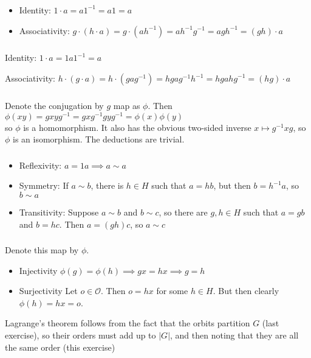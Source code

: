 \documentclass{article}
\newcommand{\inv}[1]{ {#1}^{-1} }
\newcommand{\sheaf}{ \mathcal{O} }
\begin{document}
\subsubsection{}\label{ex7p15}
\begin{itemize}
\item Identity: $1\cdot a = a\inv{1} = a1 = a$
\item Associativity: $g\cdot(h\cdot a) = g\cdot(a\inv{h})=a\inv{h}\inv{g} = a\inv{gh} = (gh)\cdot a$
\end{itemize}
\subsubsection{}\label{ex7p16}
\item Identity: $1\cdot a = 1a\inv{1} = a$
\item Associativity: $h\cdot(g\cdot a) = h\cdot (ga\inv{g}) = hga\inv{g}\inv{h} = hga\inv{hg} = (hg)\cdot a$
\subsubsection{}\label{ex7p17}
Denote the conjugation by $g$ map as $\phi$. Then\\
$\phi(xy)=gxy\inv{g}=gx\inv{g}gy\inv{g}=\phi(x)\phi(y)$\\
so $\phi$ is a homomorphism. It also has the obvious two-sided inverse $x \mapsto \inv{g}xg$, so $\phi$ is an isomorphism. The deductions are trivial.
\subsubsection{}\label{ex7p18}
\begin{itemize}
\item Reflexivity: $a = 1a \implies a \sim a$
\item Symmetry: If $a \sim b$, there is $h \in H$ such that $a=hb$, but then $b=\inv{h}a$, so $b \sim a$
\item Transitivity: Suppose $a\sim b$ and $b\sim c$, so there are $g,h\in H$ such that $a=gb$ and $b=hc$. Then $a=(gh)c$, so $a \sim c$
\end{itemize}
\subsubsection{}\label{ex7p19}
Denote this map by $\phi$. 
\begin{itemize}
\item Injectivity $\phi(g)=\phi(h)\implies gx=hx \implies g=h$
\item Surjectivity Let $o \in \sheaf$. Then $o=hx$ for some $h\in H$. But then clearly $\phi(h) = hx = o$.
\end{itemize}
Lagrange's theorem follows from the fact that the orbits partition $G$ (last exercise), so their orders must add up to $|G|$, and then noting that they are all the same order (this exercise)
\end{document}

